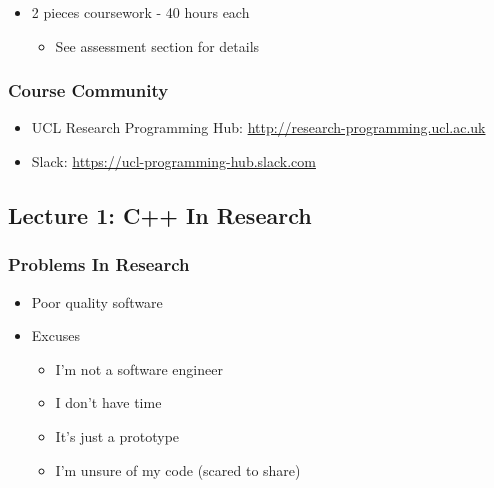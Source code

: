 \begin{itemize}
\itemsep1pt\parskip0pt
\item
  2 pieces coursework - 40 hours each

  \begin{itemize}
  \itemsep1pt\parskip0pt
  \item
    See assessment section for details
  \end{itemize}
\end{itemize}

\subsubsection{Course Community}\label{course-community}

\begin{itemize}
\itemsep1pt\parskip0pt
\item
  UCL Research Programming Hub:
  \href{http://research-programming.ucl.ac.uk/}{http://research-programming.ucl.ac.uk}
\item
  Slack:
  \href{https://ucl-programming-hub.slack.com/}{https://ucl-programming-hub.slack.com}
\end{itemize}

\subsection{Lecture 1: C++ In Research}\label{lecture-1-c-in-research}

\subsubsection{Problems In Research}\label{problems-in-research}

\begin{itemize}
\itemsep1pt\parskip0pt
\item
  Poor quality software
\item
  Excuses

  \begin{itemize}
  \itemsep1pt\parskip0pt
  \item
    I'm not a software engineer
  \item
    I don't have time
  \item
    It's just a prototype
  \item
    I'm unsure of my code (scared to share)
  \end{itemize}
\end{itemize}

